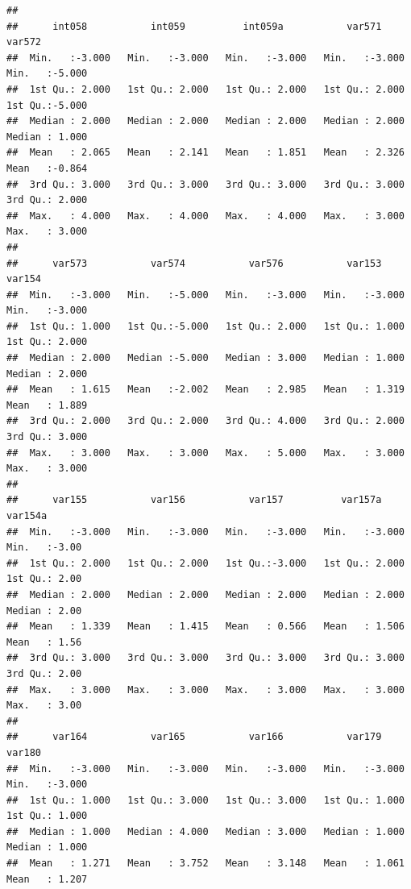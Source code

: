 \documentclass[
]{book}
\begin{document}
\begin{verbatim}
##                                                                                     
##      int058           int059          int059a           var571           var572      
##  Min.   :-3.000   Min.   :-3.000   Min.   :-3.000   Min.   :-3.000   Min.   :-5.000  
##  1st Qu.: 2.000   1st Qu.: 2.000   1st Qu.: 2.000   1st Qu.: 2.000   1st Qu.:-5.000  
##  Median : 2.000   Median : 2.000   Median : 2.000   Median : 2.000   Median : 1.000  
##  Mean   : 2.065   Mean   : 2.141   Mean   : 1.851   Mean   : 2.326   Mean   :-0.864  
##  3rd Qu.: 3.000   3rd Qu.: 3.000   3rd Qu.: 3.000   3rd Qu.: 3.000   3rd Qu.: 2.000  
##  Max.   : 4.000   Max.   : 4.000   Max.   : 4.000   Max.   : 3.000   Max.   : 3.000  
##                                                                                      
##      var573           var574           var576           var153           var154      
##  Min.   :-3.000   Min.   :-5.000   Min.   :-3.000   Min.   :-3.000   Min.   :-3.000  
##  1st Qu.: 1.000   1st Qu.:-5.000   1st Qu.: 2.000   1st Qu.: 1.000   1st Qu.: 2.000  
##  Median : 2.000   Median :-5.000   Median : 3.000   Median : 1.000   Median : 2.000  
##  Mean   : 1.615   Mean   :-2.002   Mean   : 2.985   Mean   : 1.319   Mean   : 1.889  
##  3rd Qu.: 2.000   3rd Qu.: 2.000   3rd Qu.: 4.000   3rd Qu.: 2.000   3rd Qu.: 3.000  
##  Max.   : 3.000   Max.   : 3.000   Max.   : 5.000   Max.   : 3.000   Max.   : 3.000  
##                                                                                      
##      var155           var156           var157          var157a          var154a     
##  Min.   :-3.000   Min.   :-3.000   Min.   :-3.000   Min.   :-3.000   Min.   :-3.00  
##  1st Qu.: 2.000   1st Qu.: 2.000   1st Qu.:-3.000   1st Qu.: 2.000   1st Qu.: 2.00  
##  Median : 2.000   Median : 2.000   Median : 2.000   Median : 2.000   Median : 2.00  
##  Mean   : 1.339   Mean   : 1.415   Mean   : 0.566   Mean   : 1.506   Mean   : 1.56  
##  3rd Qu.: 3.000   3rd Qu.: 3.000   3rd Qu.: 3.000   3rd Qu.: 3.000   3rd Qu.: 2.00  
##  Max.   : 3.000   Max.   : 3.000   Max.   : 3.000   Max.   : 3.000   Max.   : 3.00  
##                                                                                     
##      var164           var165           var166           var179           var180      
##  Min.   :-3.000   Min.   :-3.000   Min.   :-3.000   Min.   :-3.000   Min.   :-3.000  
##  1st Qu.: 1.000   1st Qu.: 3.000   1st Qu.: 3.000   1st Qu.: 1.000   1st Qu.: 1.000  
##  Median : 1.000   Median : 4.000   Median : 3.000   Median : 1.000   Median : 1.000  
##  Mean   : 1.271   Mean   : 3.752   Mean   : 3.148   Mean   : 1.061   Mean   : 1.207  

\end{verbatim}
\end{document}
